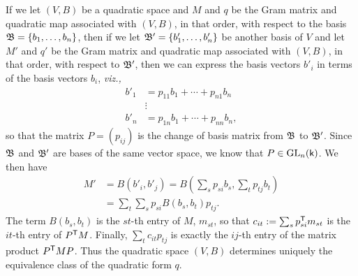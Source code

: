 If we let \((V, B)\) be a quadratic space and \(M\) and \(q\) be the Gram matrix
and quadratic map associated with \((V, B)\), in that order, with respect to the
basis \(\mathfrak{B} =\{b_1, \dots, b_n\}\), then if we let \(\mathfrak{B}' = \{b'_1, \dots,
b'_n\}\) be another basis of \(V\) and let \(M'\) and \(q'\) be the Gram matrix
and quadratic map associated with \((V, B)\), in that order, with respect to
\(\mathfrak{B}'\), then we can express the basis vectors \(b'_i\) in terms of the
basis vectors \(b_i\), \emph{viz.,}\label{sec:quadratic-space-change-of-basis}
\begin{align*}
    b'_1 &= p_{11}b_1 + \cdots + p_{n1}b_n\\
    &\vdots\\
    b'_n &= p_{1n}b_1 + \cdots + p_{nn}b_n,
\end{align*}
so that the matrix \(P = (p_{ij})\) is the change of basis matrix from
\(\mathfrak{B}\) to \(\mathfrak{B}'\). Since \(\mathfrak{B}\) and \(\mathfrak{B}'\) are bases of the
same vector space, we know that \(P \in \mathrm{GL}_{n}(\mathsf{k})\). We then have
\begin{align*}
  M' &= B(b'_i, b'_j) = B\left(\sum_{s} p_{si}b_s, \sum_t p_{tj}b_t\right)\\
  &= \sum_t \sum_s p_{si}B(b_s, b_t)p_{tj}.
\end{align*}
The term \(B(b_s, b_t)\) is the \(st\)-th entry of \(M\), \(m_{st}\), so that
\(c_{it} := \sum_s p^{\mathsf{T}}_{si}m_{st}\) is the \(it\)-th entry of
\(P^{\mathsf{T}}M\). Finally, \(\sum_t c_{it}p_{tj}\) is exactly the \(ij\)-th
entry of the matrix product \(P^{\mathsf{T}}MP\). Thus the quadratic space \((V,
B)\) determines uniquely the equivalence class of the quadratic form \(q\).

